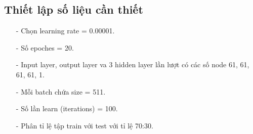 \documentclass{report}
\begin{document}
        \subsection{Thiết lập số liệu cần thiết}
            \begin{enumerate}
                \item [- ] Chọn learning rate = 0.00001.
                \item [- ] Số epoches = 20.
                \item [- ] Input layer, output layer va 3 hidden layer lần lượt có các số node 61, 61, 61, 61, 1.
                \item [- ] Mỗi batch chứa size = 511.
                \item [- ] Số lần learn (iterations) = 100.
                \item [- ] Phân tỉ lệ tập train với test với tỉ lệ 70:30.
            \end{enumerate}
            
        \fontsize{15}{10}\selectfont
\end{document}
